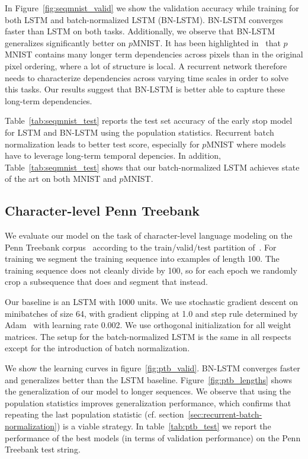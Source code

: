 \documentclass{article} %
\begin{document}
In Figure~\ref{fig:seqmnist_valid} we show the validation accuracy while training for both LSTM and batch-normalized LSTM (BN-LSTM).
BN-LSTM converges faster than LSTM on both tasks.
Additionally, we observe that BN-LSTM generalizes significantly better on $p$MNIST.
It has been highlighted in~\cite{urnn} that
$p$MNIST contains many longer term dependencies across pixels than in
the original pixel ordering, where a lot of structure is local.
A recurrent network therefore needs to characterize dependencies across varying time scales in order to solve this tasks.
Our results suggest that BN-LSTM is better able to capture these long-term dependencies.

Table~\ref{tab:seqmnist_test} reports the test set accuracy of the early stop model for LSTM and BN-LSTM using the population statistics.
Recurrent batch normalization leads to better test score, especially for $p$MNIST where models have to leverage long-term temporal depencies.
In addition, Table~\ref{tab:seqmnist_test} shows that our batch-normalized LSTM achieves state of the art on both MNIST and $p$MNIST.

\subsection{Character-level Penn Treebank}

We evaluate our model on the task of character-level language modeling on the Penn Treebank corpus~\cite{penntreebank}
according to the train/valid/test partition of~\cite{mikolov2012subword}.
For training we segment the training sequence into examples of length 100.
The training sequence does not cleanly divide by 100, so for each epoch we randomly crop a subsequence that does and segment that instead.

Our baseline is an LSTM with 1000 units.
We use stochastic gradient descent on minibatches of size 64,
with gradient clipping at 1.0 and step rule determined by Adam~\cite{kingma2014adam}
with learning rate 0.002.
We use orthogonal initialization for all weight matrices.
The setup for the batch-normalized LSTM is the same in all respects except for the introduction of batch normalization.

We show the learning curves in figure~\ref{fig:ptb_valid}.
BN-LSTM converges faster and generalizes better than the LSTM baseline.
Figure~\ref{fig:ptb_lengths} shows the generalization of our model to longer sequences.
We observe that using the population statistics improves generalization performance,
which confirms that repeating the last population statistic (cf. section~\ref{sec:recurrent-batch-normalization})
is a viable strategy.
In table~\ref{tab:ptb_test} we report the performance of the best models
(in terms of validation performance)
on the Penn Treebank test string.
\end{document}

